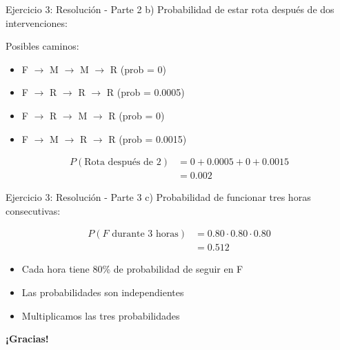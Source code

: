 \documentclass{beamer}
\begin{document}
\begin{frame}{Ejercicio 3: Resolución - Parte 2}
    b) Probabilidad de estar rota después de dos intervenciones:
    
    Posibles caminos:
    \begin{itemize}
        \item F $\rightarrow$ M $\rightarrow$ M $\rightarrow$ R (prob = 0)
        \item F $\rightarrow$ R $\rightarrow$ R $\rightarrow$ R (prob = 0.0005)
        \item F $\rightarrow$ R $\rightarrow$ M $\rightarrow$ R (prob = 0)
        \item F $\rightarrow$ M $\rightarrow$ R $\rightarrow$ R (prob = 0.0015)
    \end{itemize}
    
    \[
    \begin{split}
    P(\text{Rota después de 2}) &= 0 + 0.0005 + 0 + 0.0015 \\
    &= 0.002
    \end{split}
    \]
\end{frame}

\begin{frame}{Ejercicio 3: Resolución - Parte 3}
    c) Probabilidad de funcionar tres horas consecutivas:
    
    \[
    \begin{split}
    P(F \text{ durante 3 horas}) &= 0.80 \cdot 0.80 \cdot 0.80 \\
    &= 0.512
    \end{split}
    \]
    
    \begin{itemize}
        \item Cada hora tiene 80\% de probabilidad de seguir en F
        \item Las probabilidades son independientes
        \item Multiplicamos las tres probabilidades
    \end{itemize}
\end{frame}

\begin{frame}
    \begin{center}
        {\Huge\textbf{¡Gracias!}}
    \end{center}
\end{frame}
\end{document}
